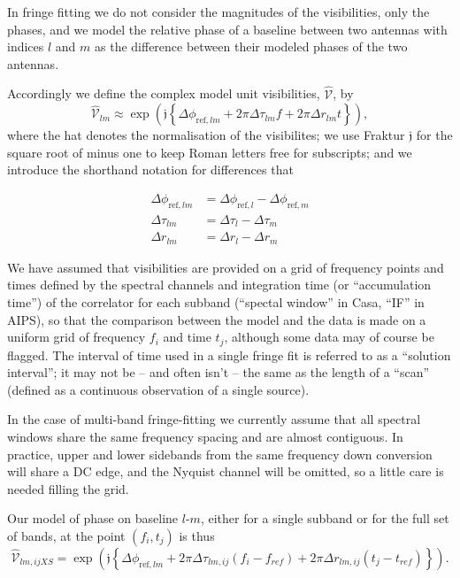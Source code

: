 \documentclass[11pt, twoside, a4paper]{article}
\begin{document}
In fringe fitting we do not consider the magnitudes of the
visibilities, only the phases, and we model the relative phase of a
baseline between two antennas with indices $l$
and $m$ as the difference between their modeled phases of the two antennas.

Accordingly we define the complex model unit
visibilities, $\hat{\mathcal{V}}$, by
\begin{equation}\label{eq:model}
\hat{\mathcal{V}}_{lm} \approx \exp\left(\mathfrak{j} \left\{
    \Delta \phi_{\mathrm{ref}, lm} + 
    2\pi \Delta \tau_{lm} f + 
    2\pi \Delta r_{lm} t
    \right\}
    \right),
\end{equation}
where the hat denotes the normalisation of the visibilites; we use
Fraktur $\mathfrak{j}$
for the square root of minus one to keep Roman letters free for
subscripts; and we introduce the shorthand notation for differences
that

\begin{align}\label{eq:diffabbr}
  \Delta \phi_{\mathrm{ref}, lm} &=   \Delta \phi_{\mathrm{ref}, l} -   \Delta \phi_{\mathrm{ref}, m} \\
  \Delta \tau_{lm}  &=   \Delta \tau_{l} - \Delta \tau_{m} \\
  \Delta r_{lm}  &=   \Delta r_{l}  -   \Delta r_{m} 
\end{align}

We have assumed that visibilities are provided on a grid of frequency
points and times defined by the spectral channels and integration time
(or ``accumulation time'') of the correlator for each subband
(``spectal window'' in Casa, ``IF'' in AIPS), so that the comparison
between the model and the data is made on a uniform grid of frequency
$f_i$
and time $t_j$,
although some data may of course be flagged. The interval of time used
in a single fringe fit is referred to as a ``solution interval''; it
may not be -- and often isn't -- the same as the length of a ``scan''
(defined as a continuous observation of a single source).

In the case of multi-band fringe-fitting we currently assume that all
spectral windows share the same frequency spacing and are almost
contiguous.  In practice, upper and lower sidebands from the same
frequency down conversion will share a DC edge, and the Nyquist channel
will be omitted, so a little care is needed filling the grid.

Our model of phase on baseline $l$-$m$, either for a single subband or
for the full set of bands, at the point $(f_i, t_j)$ is thus
\begin{equation}\label{eq:discmodel}
\hat{\mathcal{V}}_{lm, ijXS} = \exp\left(\mathfrak{j} \left\{
      \Delta \phi_{\mathrm{ref}, lm} +     
      2\pi \Delta \tau_{lm, ij} (f_{i} - f_{ref}) + 
      2\pi \Delta r_{lm, ij} (t_{j} - t_{ref})
 \right\}
\right).
\end{equation}
\end{document}
